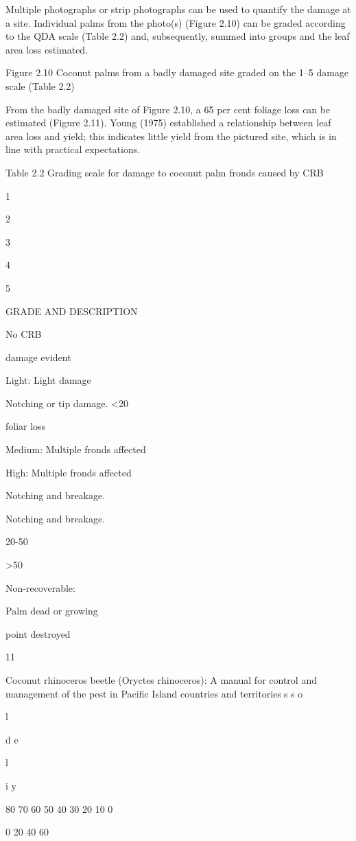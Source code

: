 \documentclass[twocolumn,letterpaper]{scrartcl}
\begin{document}
Multiple photographs or strip photographs can be used to quantify the damage at a site. Individual palms from 
the photo(s) (Figure 2.10) can be graded according to the QDA scale (Table 2.2) and, subsequently, summed into 
groups and the leaf area loss estimated. 

Figure 2.10 Coconut palms from a badly damaged site graded on the 1–5 damage scale (Table 2.2)

From the badly damaged site of Figure 2.10, a 65 per cent foliage loss can be estimated (Figure 2.11). Young 
(1975) established a relationship between leaf area loss and yield; this indicates little yield from the pictured site, 
which is in line with practical expectations.

Table 2.2 Grading scale for damage to coconut palm fronds caused by CRB 

1

2

3

4

5

GRADE AND DESCRIPTION

 No CRB 

damage evident

Light: Light damage

Notching or tip 
damage. <20%

foliar loss

Medium: Multiple 
fronds affected 

High: Multiple 
fronds affected 

Notching and breakage. 

Notching and breakage. 

20-50%

>50%

Non-recoverable: 

Palm dead or growing 

point destroyed

11

Coconut rhinoceros beetle (Oryctes rhinoceros): A manual for control and management of the pest in Pacific Island countries and territoriess
s
o

l
 

d
e

l

 

i
y
%

80
70
60
50
40
30
20
10
0

0                 20                40                60
\end{document}
